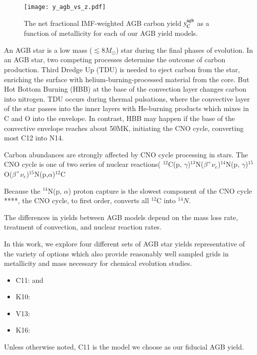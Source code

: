\documentclass[12pt,oneside]{report}
\newcommand{\Ycagb}{\ensuremath{y_{\rm C}^{\rm agb}}}
\newcommand{\sun}{\ensuremath{\odot}}
\begin{document}
\begin{figure}
    \centering
    
    \texttt{[image: y\_agb\_vs\_z.pdf]}

    \caption[AGB yield metallicity dependence]{The net fractional IMF-weighted AGB carbon yield $\Ycagb$ as a function of metallicity for each of our AGB yield models.
    }

\end{figure}

An AGB star is a low mass ($\lesssim 8 M_{\sun}$) star during the final phases of evolution.  In an AGB star, two competing processes determine the outcome of carbon production.
Third Dredge Up (TDU) is needed to eject carbon from the star, enriching the surface with helium-burning-processed material from the core. But Hot Bottom Burning (HBB) at the base of the convection layer changes carbon into nitrogen. 
TDU occurs during thermal pulsations, where the convective layer of the star passes into the inner layers with He-burning products which mixes in C and O into the envelope. In contrast, HBB may happen if the base of the convective envelope reaches about 50MK, initiating the CNO cycle, converting most C12 into N14. 

Carbon abundances are strongly affected by CNO cycle processing in stars. The CNO cycle is one of two series of nuclear reactions( $^{12}$C(p, $\gamma$)$^{13}$N($\beta^+ \nu_e$)$^{14}$N(p, $\gamma$)$^{15}$O($\beta^+\nu_e$)$^{15}$N(p,$\alpha$)$^{12}$C

Because the $^{14}$N(p, $\alpha$) proton capture is the slowest component of the CNO cycle ****, the CNO cycle, to first order, converts all $^{12}$C into $^{14}N$. 

The differences in yields between AGB models depend on the mass loss rate, treatment of convection, and nuclear reaction rates. 

In this work, we explore four different sets of AGB star yields representative of the variety of options which also provide reasonably well sampled grids in metallicity and mass necessary for chemical evolution studies.
\begin{itemize}
    \item C11: \citet{cristallo+11} and \citet{cristallo+15}
    \item K10: \citet{karakas10}
    \item V13: \citet{ventura+13}
    \item K16: \citet{KL16} \citet{karakas+18}
\end{itemize}
Unless otherwise noted, C11 is the model we choose as our fiducial AGB yield. 
\end{document}
